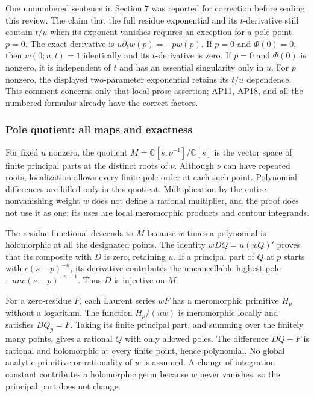 \documentclass{article}
\begin{document}
One unnumbered sentence in Section 7 was reported for correction before sealing this review. The claim that the full residue exponential and its \(t\)-derivative still contain \(t/u\) when its exponent vanishes requires an exception for a pole point \(p=0\). The exact derivative is \(u\partial_t w(p)=-p w(p)\). If \(p=0\) and \(\Phi(0)=0\), then \(w(0;u,t)=1\) identically and its \(t\)-derivative is zero. If \(p=0\) and \(\Phi(0)\) is nonzero, it is independent of \(t\) and has an essential singularity only in \(u\). For \(p\) nonzero, the displayed two-parameter exponential retains its \(t/u\) dependence. This comment concerns only that local prose assertion; AP11, AP18, and all the numbered formulas already have the correct factors.

\subsubsection{Pole quotient: all maps and exactness}\label{endpoint-analytic_pole_review--pole-quotient-all-maps-and-exactness}

For fixed \(u\) nonzero, the quotient \(M=\mathbb C[s,\nu^{-1}]/\mathbb C[s]\) is the vector space of finite principal parts at the distinct roots of \(\nu\). Although \(\nu\) can have repeated roots, localization allows every finite pole order at each such point. Polynomial differences are killed only in this quotient. Multiplication by the entire nonvanishing weight \(w\) does not define a rational multiplier, and the proof does not use it as one: its uses are local meromorphic products and contour integrands.

The residue functional descends to \(M\) because \(w\) times a polynomial is holomorphic at all the designated points. The identity \(w DQ=u(wQ)'\) proves that its composite with \(D\) is zero, retaining \(u\). If a principal part of \(Q\) at \(p\) starts with \(c(s-p)^{-n}\), its derivative contributes the uncancellable highest pole \(-u n c(s-p)^{-n-1}\). Thus \(D\) is injective on \(M\).

For a zero-residue \(F\), each Laurent series \(wF\) has a meromorphic primitive \(H_p\) without a logarithm. The function \(H_p/(u w)\) is meromorphic locally and satisfies \(DQ_p=F\). Taking its finite principal part, and summing over the finitely many points, gives a rational \(Q\) with only allowed poles. The difference \(DQ-F\) is rational and holomorphic at every finite point, hence polynomial. No global analytic primitive or rationality of \(w\) is assumed. A change of integration constant contributes a holomorphic germ because \(w\) never vanishes, so the principal part does not change.
\end{document}
